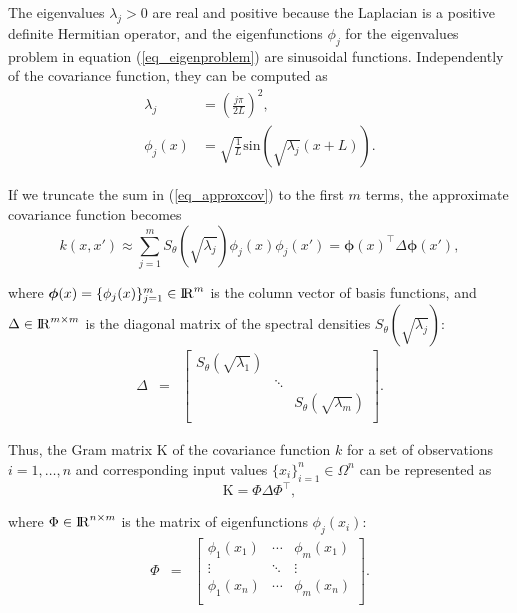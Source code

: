 \documentclass[onecolumn,a4paper,11pt]{article}
\begin{document}
\noindent The eigenvalues $\lambda_j>0$ are real and positive because the Laplacian is a positive definite Hermitian operator, and the eigenfunctions $\phi_j$ for the eigenvalues problem in equation (\ref{eq_eigenproblem}) are sinusoidal functions. Independently of the covariance function, they can be computed as
%
\begin{align}
\lambda_j&=\left(\frac{j\pi}{2L}\right)^2, \label{eq_eigenvalue}\\
\phi_j(x)&=\sqrt{\frac{1}{L}} \text{sin}\left(\sqrt{\lambda_j}(x+L)\right). \label{eq_eigenfunction}
\end{align}

If we truncate the sum in (\ref{eq_approxcov}) to the first $m$ terms, the approximate covariance function becomes
%
\begin{equation}
k(x,x') \approx \sum_{j=1}^m S_{\theta}(\sqrt{\lambda_j}) \phi_j(x) \phi_j(x') = \bm{\phi}(x)^\intercal \Delta \bm{\phi}(x'), \nonumber
\end{equation}

\noindent where $\bm{\phi}(x)=\{\phi_j(x)\}_{j=1}^{m} \in {\rm I\!R}^{m}$ is the column vector of basis functions, and $\Delta  \in {\rm I\!R}^{m\times m}$ is the diagonal matrix of the spectral densities $S_{\theta}(\sqrt{\lambda_j})$: 
%
\begin{eqnarray}
\Delta &=&  \begin{bmatrix}
    S_{\theta}(\sqrt{\lambda_1}) & & \\
    & \ddots & \nonumber \\
    & & S_{\theta}(\sqrt{\lambda_m}) \\
  \end{bmatrix}.
\end{eqnarray}

Thus, the Gram matrix $\text{K}$ of the covariance function $k$ for a set of observations $i=1,\ldots,n$ and corresponding input values $\{x_i\}_{i=1}^{n} \in \Omega^{n}$ can be represented as
%
\begin{equation}
\text{K}= \Phi \Delta \Phi^\intercal, \nonumber
\end{equation}

\noindent where $\Phi \in {\rm I\!R}^{n\times m}$ is the matrix of eigenfunctions $\phi_j(x_i)$:
%
\begin{eqnarray}
\Phi &=&  \left[ {\begin{array}{ccc}
   \phi_1(x_1) & \cdots & \phi_m(x_1)  \\
    \vdots &\ddots & \vdots  \nonumber \\ 
    \phi_1(x_n) & \cdots & \phi_m(x_n) \\
  \end{array} } \right].
\end{eqnarray}
 
\end{document}
